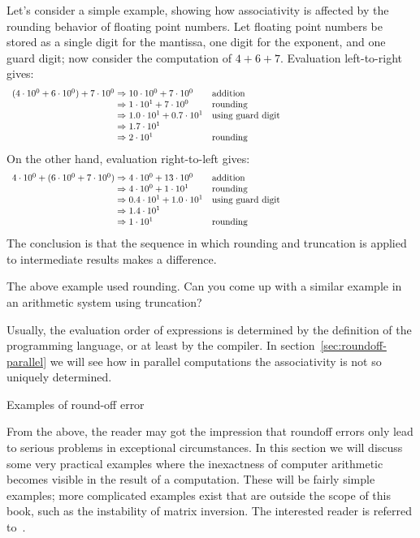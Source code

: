 Let's consider a simple example, showing how associativity is affected
by the rounding behavior of floating point numbers.
Let floating point numbers be stored as a single digit for the mantissa,
one digit for the exponent, and one guard digit;
now consider the computation of $4+6+7$.
Evaluation left-to-right gives:
\begin{equation}
\begin{array}{l@{{}\Rightarrow{}}lp{3in}}
(4\cdot10^0 + 6\cdot10^0)+7\cdot10^0&10\cdot10^0+7\cdot10^0&addition\\
&1\cdot 10^1 + 7\cdot10^0&rounding\\
&1.0\cdot 10^1 + 0.7\cdot10^1&using guard digit\\
&1.7\cdot 10^1\\
&2\cdot10^1&rounding
\end{array}
\end{equation}
On the other hand, evaluation right-to-left gives:
\begin{equation}
\begin{array}{l@{{}\Rightarrow{}}lp{3in}}
4\cdot10^0 + (6\cdot10^0 + 7\cdot10^0)&4\cdot 10^0 + 13\cdot10^0&addition\\
&4\cdot 10^0 + 1\cdot10^1&rounding\\
&0.4\cdot 10^1 + 1.0\cdot10^1&using guard digit\\
&1.4\cdot 10^1\\
&1\cdot10^1&rounding
\end{array}
\end{equation}
The conclusion is that the sequence in which rounding and truncation is applied to
intermediate results makes a difference.

\begin{exercise}
  The above example used rounding. Can you come up with a similar example
  in an arithmetic system using truncation?
\end{exercise}


Usually, the evaluation order of expressions is determined by the definition of the
programming language, or at least by the compiler.
In section~\ref{sec:roundoff-parallel} we will see how in parallel computations the associativity
is not so uniquely determined.

 {Examples of round-off error}

From the above, the reader may got the impression that roundoff errors
only lead to serious problems in exceptional circumstances. In this
section we will discuss some very practical examples where the
inexactness of computer arithmetic becomes visible in the result of a
computation. These will be fairly simple examples; more complicated
examples exist that are outside the scope of this book, such as the
instability of matrix inversion. The interested reader is referred
to~\cite{Higham:2002:ASN,Wilkinson:roundoff}.


